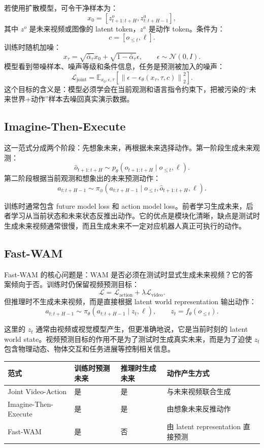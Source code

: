 \documentclass[11pt,a4paper]{ctexart}
\begin{document}
若使用扩散模型，可令干净样本为：
\[
  x_0=[z^o_{t+1:t+H},z^a_{t:t+H-1}],
\]
其中 $z^o$ 是未来视频或图像的 latent token，$z^a$ 是动作 token。条件为：
\[
  c=[o_{\le t},\ell].
\]
训练时随机加噪：
\[
  x_\tau=\sqrt{\bar{\alpha}_\tau}x_0+\sqrt{1-\bar{\alpha}_\tau}\epsilon,
  \qquad \epsilon\sim\mathcal{N}(0,I).
\]
模型看到带噪样本、噪声等级和条件信息，任务是预测被加入的噪声：
\[
  \mathcal{L}_{\mathrm{joint}}
  =
  \mathbb{E}_{x_0,\epsilon,\tau}
  \left[
    \left\|
      \epsilon-\epsilon_\theta(x_\tau,\tau,c)
    \right\|_2^2
  \right].
\]
这个目标的含义是：模型必须学会在当前观测和语言指令约束下，把被污染的“未来世界+动作”样本去噪回真实演示数据。

\subsection{Imagine-Then-Execute}

这一范式分成两个阶段：先想象未来，再根据未来选择动作。第一阶段生成未来观测：
\[
  \hat{o}_{t+1:t+H}
  \sim
  p_\theta(o_{t+1:t+H}\mid o_{\le t},\ell).
\]
第二阶段根据当前观测和想象出的未来预测动作：
\[
  a_{t:t+H-1}
  \sim
  \pi_\phi(a_{t:t+H-1}\mid o_{\le t},\hat{o}_{t+1:t+H},\ell).
\]

训练时通常包含 future model loss 和 action model loss。前者学习生成未来，后者学习从当前状态和未来状态反推出动作。它的优点是模块化清晰，缺点是测试时生成未来视频通常很慢，而且生成未来不一定对应机器人真正可执行的动作。

\subsection{Fast-WAM}

Fast-WAM 的核心问题是：WAM 是否必须在测试时显式生成未来视频？它的答案倾向于否。训练时仍保留视频预测目标：
\[
  \mathcal{L}
  =
  \mathcal{L}_{\mathrm{action}}
  +
  \lambda\mathcal{L}_{\mathrm{video}}.
\]
但推理时不生成未来视频，而是直接根据 latent world representation 输出动作：
\[
  a_{t:t+H-1}\sim \pi_\theta(a_{t:t+H-1}\mid z_t,\ell),
  \qquad z_t=f_\theta(o_{\le t}).
\]

这里的 $z_t$ 通常由视频或视觉模型产生，但更准确地说，它是当前时刻的 latent world state。视频预测目标的作用不是为了测试时生成真实未来，而是为了迫使 $z_t$ 包含物理动态、物体交互和任务进展等控制相关信息。

\begin{center}
\begin{tabular}{llll}
\toprule
范式 & 训练时预测未来 & 推理时生成未来 & 动作产生方式 \\
\midrule
Joint Video-Action & 是 & 是 & 与未来视频联合生成 \\
Imagine-Then-Execute & 是 & 是 & 由想象未来反推动作 \\
Fast-WAM & 是 & 否 & 由 latent representation 直接预测 \\
\bottomrule
\end{tabular}
\end{center}
\end{document}
